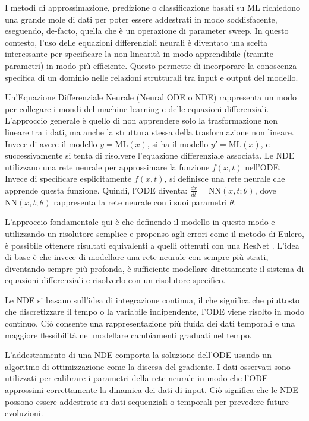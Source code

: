 I metodi di approssimazione, predizione o classificazione basati su ML richiedono una grande mole di dati per poter essere addestrati in modo soddisfacente, eseguendo, de-facto, quella che è un operazione di parameter sweep. In questo contesto, l'uso delle equazioni differenziali neurali è diventato 
una scelta interessante per specificare la non linearità in modo 
apprendibile (tramite parametri) in modo più efficiente. Questo permette 
di incorporare la conoscenza specifica di un dominio nelle relazioni 
strutturali tra input e output del modello.

Un'Equazione Differenziale Neurale (Neural ODE o NDE) rappresenta un modo per 
collegare i mondi del machine learning e delle equazioni differenziali. 
L'approccio generale è quello di non apprendere solo la trasformazione 
non lineare tra i dati, ma anche la struttura stessa della 
trasformazione non lineare. Invece di avere il modello $y = \mathrm{ML}(x)$, 
si ha il modello $y' = \mathrm{ML}(x)$, e successivamente si tenta di risolvere 
l'equazione differenziale associata. Le NDE utilizzano una rete neurale per approssimare la funzione $f(x,t)$ nell'ODE. Invece di specificare esplicitamente $f(x,t)$, si definisce una rete neurale che apprende questa funzione. Quindi, l'ODE diventa: $\frac{dx}{dt}=\mathrm{NN}(x,t;\theta)$, dove $\mathrm{NN}(x,t;\theta)$ rappresenta la rete neurale con i suoi parametri $\theta$.

L'approccio fondamentale qui è che definendo il modello in questo modo e 
utilizzando un risolutore semplice e propenso agli errori come il metodo 
di Eulero, è possibile ottenere risultati equivalenti a quelli ottenuti 
con una ResNet \cite{7780459}. L'idea di base è che invece di 
modellare una rete neurale con sempre più strati, diventando sempre 
più profonda, è sufficiente modellare direttamente il sistema di 
equazioni differenziali e risolverlo con un risolutore specifico.

Le NDE si basano sull'idea di integrazione continua, il che significa che piuttosto che discretizzare il tempo o la variabile indipendente, l'ODE viene risolto in modo continuo. Ciò consente una rappresentazione più fluida dei dati temporali e una maggiore flessibilità nel modellare cambiamenti graduati nel tempo.

L'addestramento di una NDE comporta la soluzione dell'ODE usando un algoritmo di ottimizzazione come la discesa del gradiente. I dati osservati sono utilizzati per calibrare i parametri della rete neurale in modo che l'ODE approssimi correttamente la dinamica dei dati di input. Ciò significa che le NDE possono essere addestrate su dati sequenziali o temporali per prevedere future evoluzioni.


